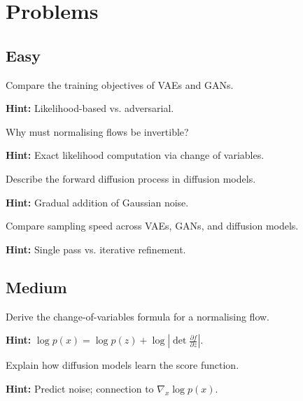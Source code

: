 
\section*{Problems}

\subsection*{Easy}

\begin{problem}
Compare the training objectives of VAEs and GANs.

\textbf{Hint:} Likelihood-based vs. adversarial.
\end{problem}

\begin{problem}
Why must normalising flows be invertible?

\textbf{Hint:} Exact likelihood computation via change of variables.
\end{problem}

\begin{problem}
Describe the forward diffusion process in diffusion models.

\textbf{Hint:} Gradual addition of Gaussian noise.
\end{problem}

\begin{problem}
Compare sampling speed across VAEs, GANs, and diffusion models.

\textbf{Hint:} Single pass vs. iterative refinement.
\end{problem}

\subsection*{Medium}

\begin{problem}
Derive the change-of-variables formula for a normalising flow.

\textbf{Hint:} $\log p(x) = \log p(z) + \log|\det \frac{\partial f}{\partial z}|$.
\end{problem}

\begin{problem}
Explain how diffusion models learn the score function.

\textbf{Hint:} Predict noise; connection to $\nabla_x \log p(x)$.
\end{problem}


